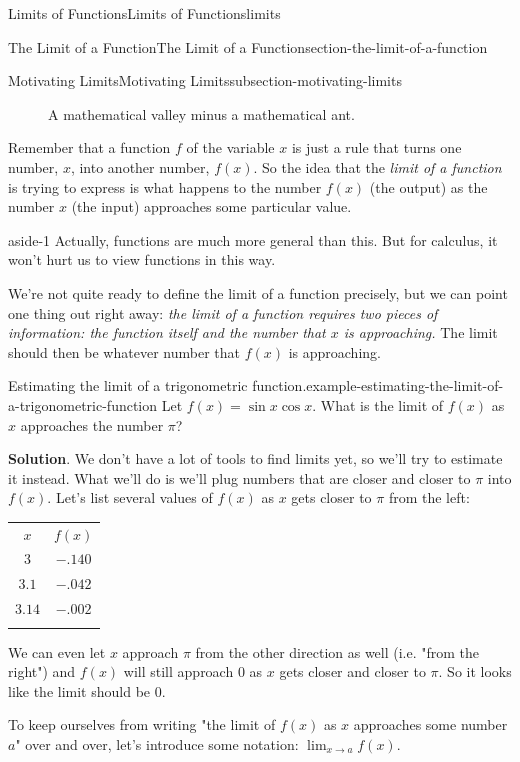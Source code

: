 \documentclass[oneside,10pt,]{book}
\numberwithin{equation}{section}
\newcommand{\hrulethin}  {\noalign{\hrule height 0.04em}}
\newcommand{\hrulethick} {\noalign{\hrule height 0.11em}}
\begin{document}
\begin{chapterptx}{Limits of Functions}{}{Limits of Functions}{}{}{limits}
\begin{sectionptx}{The Limit of a Function}{}{The Limit of a Function}{}{}{section-the-limit-of-a-function}
\begin{subsectionptx}{Motivating Limits}{}{Motivating Limits}{}{}{subsection-motivating-limits}
\begin{figure}
\caption{A mathematical valley minus a mathematical ant.\label{figure-math-valley}}
\end{figure}
\hypertarget{p-3}{}%
Remember that a function \(f\) of the variable \(x\) is just a rule that turns one number, \(x\), into another number, \(f(x)\). So the idea that the \emph{limit of a function} is trying to express is what happens to the number \(f(x)\) (the output) as the number \(x\) (the input) approaches some particular value.%
\begin{aside}{}{aside-1}%
\hypertarget{p-4}{}%
Actually, functions are much more general than this. But for calculus, it won't hurt us to view functions in this way.%
\end{aside}
\hypertarget{p-5}{}%
We're not quite ready to define the limit of a function precisely, but we can point one thing out right away: \emph{the limit of a function requires two pieces of information: the function itself and the number that \(x\) is approaching.} The limit should then be whatever number that \(f(x)\) is approaching.%
\begin{example}{Estimating the limit of a trigonometric function.}{example-estimating-the-limit-of-a-trigonometric-function}%
\hypertarget{p-6}{}%
Let \(f(x) = \sin x\cos x\). What is the limit of \(f(x)\) as \(x\) approaches the number \(\pi\)?%
\par\smallskip%
\noindent\textbf{Solution}.\hypertarget{solution-1}{}\quad%
\hypertarget{p-7}{}%
We don't have a lot of tools to find limits yet, so we'll try to estimate it instead. What we'll do is we'll plug numbers that are closer and closer to \(\pi\) into \(f(x)\). Let's list several values of \(f(x)\) as \(x\) gets closer to \(\pi\) from the left:%
\begin{table}
\centering
\begin{tabular}{cc}\hrulethick
\(x\)&\(f(x)\)\tabularnewline\hrulethin
\(3\)&\(-.140\)\tabularnewline[0pt]
\(3.1\)&\(-.042\)\tabularnewline[0pt]
\(3.14\)&\(-.002\)\tabularnewline\hrulethick
\end{tabular}
\end{table}
\hypertarget{p-8}{}%
We can even let \(x\) approach \(\pi\) from the other direction as well (i.e. "from the right") and \(f(x)\) will still approach \(0\) as \(x\) gets closer and closer to \(\pi\). So it looks like the limit should be \(0\).%
\end{example}
\hypertarget{p-9}{}%
To keep ourselves from writing "the limit of \(f(x)\) as \(x\) approaches some number \(a\)" over and over, let's introduce some notation: \(\lim_{x\to a}f(x)\).%

\end{subsectionptx}
\end{sectionptx}
\end{chapterptx}
\end{document}
